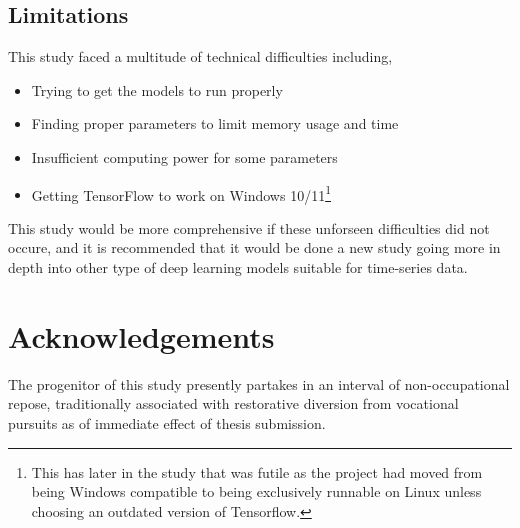 \subsection{Limitations}

This study faced a multitude of technical difficulties including,
\begin{itemize}
	\item Trying to get the models to run properly
	\item Finding proper parameters to limit memory usage and time
	\item Insufficient computing power for some parameters
	\item Getting TensorFlow to work on Windows 10/11\footnote{This has later in the study that was futile as the project had moved from being Windows compatible to being exclusively runnable on Linux unless choosing an outdated version of Tensorflow.}
\end{itemize}
This study would be more comprehensive if these unforseen difficulties did not occure, and it is recommended that it would be done a new study going more in depth into other type of deep learning models suitable for time-series data.


\section{Acknowledgements}
The progenitor of this study presently partakes in an interval of non-occupational repose, traditionally associated with restorative diversion from vocational pursuits as of immediate effect of thesis submission.
\label{pg:LastBread}